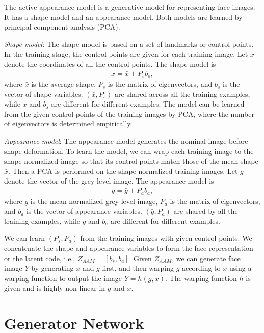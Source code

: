 \documentclass{article}
\begin{document}
The active appearance model \cite{cootes2001active,cootes2015active} is a generative model for representing face images. It has a shape model and an appearance model. Both models are learned by principal component analysis (PCA). 

\textit{Shape model}: The shape model is based on a set of landmarks or control points. In the training stage, the control points are given for each training image.  Let $x$ denote the coordinates of all the control points. The shape model is 
\begin{eqnarray}
\label{eqn1}
x = \bar{x} + P_s b_s, 
\end{eqnarray}
where $\bar{x}$ is the average shape, $P_s$ is the matrix of eigenvectors, and $b_s$ is the vector of shape variables. $(\bar{x}, P_s)$ are shared across all the training examples, while $x$ and $b_s$ are different for different examples. The model can be learned from the given control points of the training images by PCA, where the number of eigenvectors is determined empirically. 

\textit{Appearance model}: The appearance model generates the nominal image before shape deformation. To learn the model, we can wrap each training image to the shape-normalized image so that its control points match those of the mean shape $\bar{x}$. Then a PCA is performed on the shape-normalized training images.  Let $g$ denote the vector of the grey-level image. The appearance model is
\begin{eqnarray}
\label{eqn2}
g = \bar{g} + P_a b_a, 
\end{eqnarray}
where $\bar{g}$ is the mean normalized grey-level image, $P_a$ is the matrix of eigenvectors,  and $b_a$ is the vector of appearance variables. $(\bar{g}, P_a)$ are shared by all the training examples, while $g$ and $b_a$ are different for different examples. 

We can learn $(P_s, P_a)$ from the training images with given control points. We concatenate the shape and appearance variables to form the face representation or the latent code, i.e., $Z_{AAM} = [b_s, b_a]$. Given $Z_{AAM}$, we can generate face image $Y$ by generating $x$ and $g$ first, and then warping $g$ according to $x$ using a warping function to output the image $Y = h(g, x)$. The warping function $h$ is given and is highly non-linear in $g$ and $x$. 


\section{Generator Network} \label{sec:VAE} %
\end{document}

